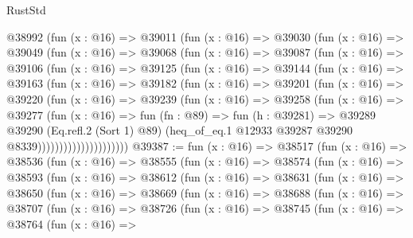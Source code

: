 \begin{lexlean}{RustStd}
\begin{coremodule}
          @38992
            (fun (x : @16) =>
            @39011
              (fun (x : @16) =>
              @39030
                (fun (x : @16) =>
                @39049
                  (fun (x : @16) =>
                  @39068
                    (fun (x : @16) =>
                    @39087
                      (fun (x : @16) =>
                      @39106
                        (fun (x : @16) =>
                        @39125
                          (fun (x : @16) =>
                          @39144
                            (fun (x : @16) =>
                            @39163
                              (fun (x : @16) =>
                              @39182
                                (fun (x : @16) =>
                                @39201
                                  (fun (x : @16) =>
                                  @39220
                                    (fun (x : @16) =>
                                    @39239
                                      (fun (x : @16) =>
                                      @39258
                                        (fun (x : @16) =>
                                        @39277
                                          (fun (x : @16) =>
                                          fun (fn : @89) =>
                                          fun (h : @39281) =>
                                          @39289
                                            @39290
                                            (Eq.refl.{2} (Sort 1) @89)
                                            (heq_of_eq.{1}
                                              @12933
                                              @39287
                                              @39290
                                              @8339)))))))))))))))))))))
@39387 := fun (x : @16) =>
  @38517
    (fun (x : @16) =>
    @38536
      (fun (x : @16) =>
      @38555
        (fun (x : @16) =>
        @38574
          (fun (x : @16) =>
          @38593
            (fun (x : @16) =>
            @38612
              (fun (x : @16) =>
              @38631
                (fun (x : @16) =>
                @38650
                  (fun (x : @16) =>
                  @38669
                    (fun (x : @16) =>
                    @38688
                      (fun (x : @16) =>
                      @38707
                        (fun (x : @16) =>
                        @38726
                          (fun (x : @16) =>
                          @38745
                            (fun (x : @16) =>
                            @38764
                              (fun (x : @16) =>

\end{coremodule}
\end{lexlean}
